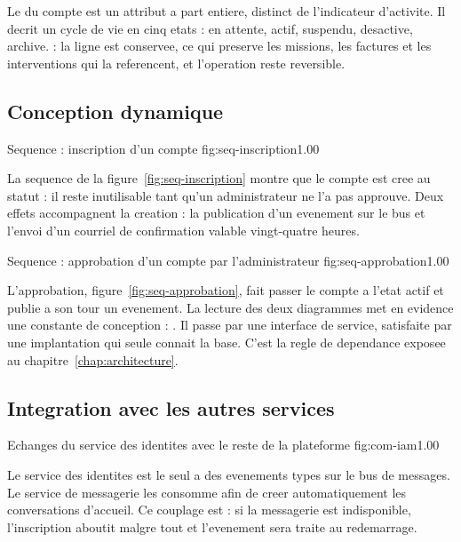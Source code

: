 Le  du compte est un attribut a part entiere, distinct
de l'indicateur d'activite. Il decrit un cycle de vie en cinq etats : en
attente, actif, suspendu, desactive, archive.  : la ligne est conservee, ce qui preserve les
missions, les factures et les interventions qui la referencent, et
l'operation reste reversible.

\subsection{Conception dynamique}

  {Sequence : inscription d'un compte}
  {fig:seq-inscription}{1.00}

La sequence de la figure~\ref{fig:seq-inscription} montre que le compte
est cree au statut  : il reste inutilisable tant
qu'un administrateur ne l'a pas approuve. Deux effets accompagnent la
creation : la publication d'un evenement sur le bus et l'envoi d'un
courriel de confirmation valable vingt-quatre heures.

  {Sequence : approbation d'un compte par l'administrateur}
  {fig:seq-approbation}{1.00}

L'approbation, figure~\ref{fig:seq-approbation}, fait passer le compte a
l'etat actif et publie a son tour un evenement. La lecture des deux
diagrammes met en evidence une constante de conception :
. Il
passe par une interface de service, satisfaite par une implantation qui
seule connait la base. C'est la regle de dependance exposee au
chapitre~\ref{chap:architecture}.

\subsection{Integration avec les autres services}

  {Echanges du service des identites avec le reste de la plateforme}
  {fig:com-iam}{1.00}

Le service des identites est le seul a  des evenements
types sur le bus de messages. Le service de messagerie les consomme afin
de creer automatiquement les conversations d'accueil. Ce couplage est
 : si la messagerie est indisponible, l'inscription
aboutit malgre tout et l'evenement sera traite au redemarrage.

